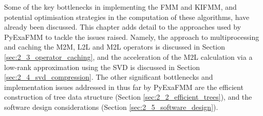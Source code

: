 Some of the key bottlenecks in implementing the \gls{FMM} and \gls{KIFMM}, and potential
optimisation strategies in the computation of these algorithms, have already been
discussed. This chapter adds detail to the approaches used by \gls{PyExaFMM} to tackle
the issues raised. Namely, the approach to multiprocessing and caching the \gls{M2M},
\gls{L2L} and \gls{M2L} operators is discussed in Section \ref{sec:2_3_operator_caching}, and
the acceleration of the \gls{M2L} calculation via a low-rank approximation using the \gls{SVD}
is discussed in Section \ref{sec:2_4_svd_compression}. The other significant bottlenecks
and implementation issues addressed in thus far by \gls{PyExaFMM} are the
efficient construction of tree data structure (Section \ref{sec:2_2_efficient_trees}),
and the software design considerations (Section \ref{sec:2_5_software_design}).

